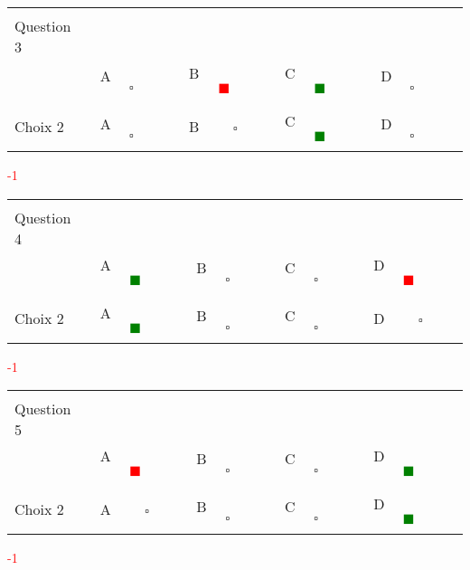 \documentclass{book}%
\begin{document}
\begin{center}%
\begin{tabular}{| l  l  l  l  l |}%
\hline%
 & & & & \\%
Question 3\qquad \qquad\ & & & & \\%
& A $\qquad \square \qquad$& B \textcolor{red}{$\qquad \blacksquare \qquad$}& C \textcolor{green}{$\qquad \blacksquare \qquad$}& D $\qquad \square \qquad$\\%
 & & & & \\%
\hline%
 & & & &  \\%
Choix 2& A $\qquad \square \qquad$& B $\qquad \square \qquad$& C \textcolor{green}{$\qquad \blacksquare \qquad$}& D $\qquad \square \qquad$\\%
 & & & &  \\%
\hline%
\end{tabular}%
 \qquad  \textcolor{red}{-1}%
\\ \vskip3mm%
\end{center}%
\thispagestyle{empty}%
\begin{center}%
\begin{tabular}{| l  l  l  l  l |}%
\hline%
 & & & & \\%
Question 4\qquad \qquad\ & & & & \\%
& A \textcolor{green}{$\qquad \blacksquare \qquad$}& B $\qquad \square \qquad$& C $\qquad \square \qquad$& D \textcolor{red}{$\qquad \blacksquare \qquad$}\\%
 & & & & \\%
\hline%
 & & & &  \\%
Choix 2& A \textcolor{green}{$\qquad \blacksquare \qquad$}& B $\qquad \square \qquad$& C $\qquad \square \qquad$& D $\qquad \square \qquad$\\%
 & & & &  \\%
\hline%
\end{tabular}%
 \qquad  \textcolor{red}{-1}%
\\ \vskip3mm%
\end{center}%
\thispagestyle{empty}%
\begin{center}%
\begin{tabular}{| l  l  l  l  l |}%
\hline%
 & & & & \\%
Question 5\qquad \qquad\ & & & & \\%
& A \textcolor{red}{$\qquad \blacksquare \qquad$}& B $\qquad \square \qquad$& C $\qquad \square \qquad$& D \textcolor{green}{$\qquad \blacksquare \qquad$}\\%
 & & & & \\%
\hline%
 & & & &  \\%
Choix 2& A $\qquad \square \qquad$& B $\qquad \square \qquad$& C $\qquad \square \qquad$& D \textcolor{green}{$\qquad \blacksquare \qquad$}\\%
 & & & &  \\%
\hline%
\end{tabular}%
 \qquad  \textcolor{red}{-1}%
\\ \vskip3mm%
\end{center}%
\end{document}
